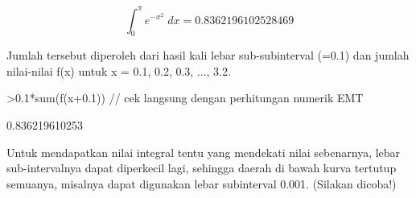 \documentclass{article}
\begin{document}
\begin{eulernotebook}
\begin{eulercomment}
\begin{eulercomment}
\begin{eulercomment}
\end{eulercomment}
\begin{eulerformula}
\[
\int_{0}^{\pi}{e^ {- x^2 }\;dx}=0.8362196102528469
\]
\end{eulerformula}
\begin{eulercomment}
Jumlah tersebut diperoleh dari hasil kali lebar sub-subinterval (=0.1)
dan jumlah nilai-nilai f(x) untuk x = 0.1, 0.2, 0.3, ..., 3.2.
\end{eulercomment}
\begin{eulerprompt}
>0.1*sum(f(x+0.1)) // cek langsung dengan perhitungan numerik EMT
\end{eulerprompt}
\begin{euleroutput}
  0.836219610253
\end{euleroutput}
\begin{eulercomment}
Untuk mendapatkan nilai integral tentu yang mendekati nilai sebenarnya, lebar
sub-intervalnya dapat diperkecil lagi, sehingga daerah di bawah kurva tertutup
semuanya, misalnya dapat digunakan lebar subinterval 0.001. (Silakan dicoba!)


\end{eulercomment}
\end{eulercomment}
\end{eulercomment}
\end{eulernotebook}
\end{document}
